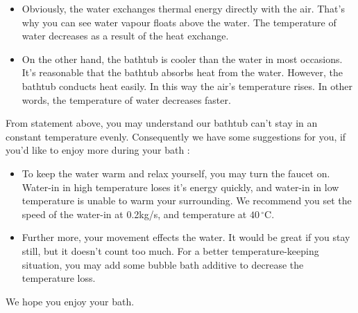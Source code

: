 \documentclass[12pt,a4paper,titlepage]{article}
\begin{document}
\begin{itemize}
\item Obviously, the water exchanges thermal energy directly with the air. That's why you can see water vapour floats above the water. The temperature of water decreases as a result of the heat exchange.
\item On the other hand, the bathtub is cooler than the water in most occasions. It's reasonable that the bathtub absorbs heat from the water. However, the bathtub conducts heat easily. In this way the air's temperature rises. In other words, the temperature of water decreases faster.
\end{itemize}
From statement above, you may understand our bathtub can't stay in an constant temperature evenly. Consequently we have some suggestions for you, if you'd like to enjoy more during your bath :
\begin{itemize}
\item To keep the water warm and relax yourself, you may turn the faucet on. Water-in in high temperature loses it's energy quickly, and water-in in low temperature is unable to warm your surrounding. We recommend you set the speed of the water-in at 0.2kg/s, and temperature at $40\,^{\circ}\mathrm{C}$.
\item Further more, your movement effects the water. It would be great if you stay still, but it doesn't count too much. For a better temperature-keeping situation, you may add some bubble bath additive to decrease the temperature loss.
\end{itemize}
We hope you enjoy your bath.
\end{document}
